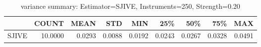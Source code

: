\begin{table}[ht]
\centering
\caption{variance summary: Estimator=SJIVE, Instruments=250, Strength=0.20}
\begin{tabular}{lrrrrrrrr}
\toprule
 & COUNT & MEAN & STD & MIN & 25\% & 50\% & 75\% & MAX \\
\midrule
SJIVE & 10.0000 & 0.0293 & 0.0088 & 0.0192 & 0.0243 & 0.0267 & 0.0328 & 0.0491 \\
\bottomrule
\end{tabular}
\end{table}
